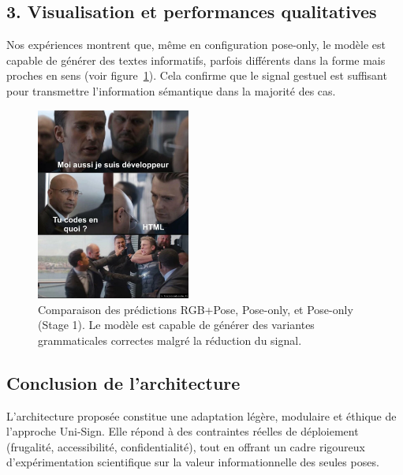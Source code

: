 \subsection*{3. Visualisation et performances qualitatives}

Nos expériences montrent que, même en configuration pose-only, le modèle est capable de générer des textes informatifs, parfois différents dans la forme mais proches en sens (voir figure~\ref{fig:prediction_example}). Cela confirme que le signal gestuel est suffisant pour transmettre l’information sémantique dans la majorité des cas.

\begin{figure}[h]
    \centering
    \includegraphics[width=0.45\textwidth]{figures/dev_joke.png}
    \caption{Comparaison des prédictions RGB+Pose, Pose-only, et Pose-only (Stage 1). Le modèle est capable de générer des variantes grammaticales correctes malgré la réduction du signal.}
    \label{fig:prediction_example}
\end{figure}

\subsection*{Conclusion de l’architecture}

L’architecture proposée constitue une adaptation légère, modulaire et éthique de l’approche Uni-Sign. Elle répond à des contraintes réelles de déploiement (frugalité, accessibilité, confidentialité), tout en offrant un cadre rigoureux d’expérimentation scientifique sur la valeur informationnelle des seules poses.


